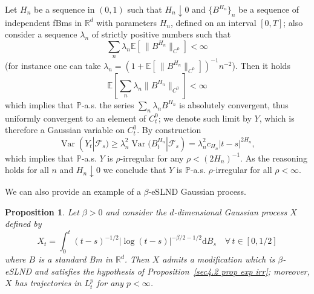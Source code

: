 \documentclass[10pt]{article}
\newcommand{\mathd}{\mathrm{d}}
\newcommand{\nobracket}{}
\newcommand{\tmop}[1]{\ensuremath{\operatorname{#1}}}
\newtheorem{proposition}[theorem]{Proposition}
\begin{document}
\begin{enumerate}[label=\roman*.]
    Let $H_n$ be a sequence in $(0, 1)$ such that $H_n \downarrow 0$ and $\{
    B^{H_n} \}_n$ be a sequence of independent fBms in $\mathbb{R}^d$ with
    parameters $H_n$, defined on an interval $[0, T]$; also consider a
    sequence $\lambda_n$ of strictly positive numbers such that
    \[ \sum_n \lambda_n \mathbb{E} \left[ \, \| B^{H_n} \|_{C^0}  \right] <
       \infty \]
    (for instance one can take $\lambda_n = \left( 1 +\mathbb{E} \left[ \, \|
    B^{H_n} \|_{C^0}  \right] \right)^{- 1} n^{- 2}$). Then it holds
    \[ \mathbb{E} \left[ \sum_n \lambda_n  \| B^{H_n} \|_{C^0} \right] <
       \infty \]
    which implies that $\mathbb{P}$-a.s. the series $\sum_n \lambda_n B^{H_n}$
    is absolutely convergent, thus uniformly convergent to an element of
    $C^0_t$; we denote such limit by $Y$, which is therefore a Gaussian
    variable on $C^0_t$. By construction
    \[ \tmop{Var} (Y_t | \mathcal{F}_s \nobracket) \geqslant \lambda^2_n
       \tmop{Var} (B^{H_n}_t | \mathcal{F}_s \nobracket) = \lambda^2_n c_{H_n}
       | t - s |^{2 H_n}, \]
    which implies that $\mathbb{P}$-a.s. $Y$ is $\rho$-irregular for any $\rho
    < (2 H_n)^{- 1}$. As the reasoning holds for all $n$ and $H_n \downarrow
    0$ we conclude that $Y$ is $\mathbb{P}$\mbox{-}a.s.
    $\rho$\mbox{-}irregular for all $\rho < \infty$.
\end{enumerate}
%
We can also provide an example of a $\beta$\mbox{-}eSLND Gaussian process.

\begin{proposition}
  \label{sec4.2 prop wierd process}Let $\beta > 0$ and consider the
  $d$\mbox{-}dimensional Gaussian process $X$ defined by
  \begin{equation}
    X_t = \int_0^t (t - s)^{- 1 / 2} | \log (t - s) |^{- \beta / 2 - 1 / 2}
    \mathd B_s \quad \forall \, t \in [0, 1 / 2] \label{sec4.2 wierd
    process}
  \end{equation}
  where $B$ is a standard Bm in $\mathbb{R}^d$. Then $X$ admits a modification
  which is $\beta$\mbox{-}eSLND and satisfies the hypothesis of
  Proposition~\ref{sec4.2 prop exp irr}; moreover, $X$ has trajectories in
  $L^p_t$ for any $p < \infty$.
\end{proposition}
\end{document}
